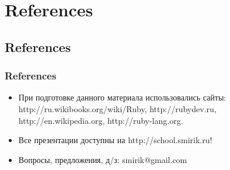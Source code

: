 \documentclass[compress,red]{beamer}
\begin{document}
\section{References}
\subsection{References}
\begin{frame}[fragile]
  \frametitle{References}
  \begin{itemize}
    \item При подготовке данного материала использовались сайты: http://ru.wikibooks.org/wiki/Ruby, http://rubydev.ru, http://en.wikipedia.org, http://ruby-lang.org.
    \item Все презентации доступны на http://school.smirik.ru!
    \item Вопросы, предложения, д/з: smirik@gmail.com
  \end{itemize}
\end{frame}
\end{document}
